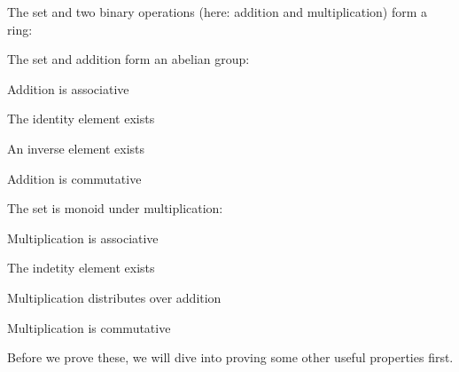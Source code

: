 \begin{compactitem}
  \item The set and two binary operations (here: addition and multiplication) form a ring:
  \begin{compactitem}
    \item The set and addition form an abelian group:
    \begin{compactitem}
    \item Addition is associative
    \item The identity element exists
    \item An inverse element exists
    \item Addition is commutative
    \end{compactitem}
  \item The set is monoid under multiplication:
    \begin{compactitem}
    \item Multiplication is associative
    \item The indetity element exists
    \end{compactitem}
  \item Multiplication distributes over addition
  \end{compactitem}
  \item Multiplication is commutative
\end{compactitem}
Before we prove these, we will dive into proving some other useful properties first.
